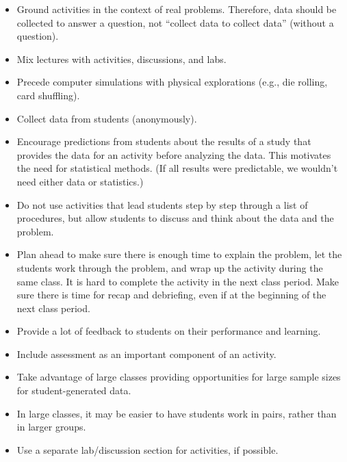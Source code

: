 \documentclass[twoside,openany]{tufte-book}
\begin{document}
\vspace{.2in}
\noindent {}
\begin{itemize}[leftmargin=1cm, itemsep=.2em]
\item Ground activities in the context of real problems. Therefore, data should be collected to answer a question, not ``collect data to collect data'' (without a question).
\item Mix lectures with activities, discussions, and labs.
\item Precede computer simulations with physical explorations (e.g., die rolling, card shuffling).
\item Collect data from students (anonymously).
\item Encourage predictions from students about the results of a study that provides the data for an activity before analyzing the data. This motivates the need for statistical methods. (If all results were predictable, we wouldn't need either data or statistics.)
\item Do not use activities that lead students step by step through a list of procedures, but allow students to discuss and think about the data and the problem.  
\item Plan ahead to make sure there is enough time to explain the problem, let the students work through the problem, and wrap up the activity during the same class. It is hard to complete the activity in the next class period. Make sure there is time for recap and debriefing, even if at the beginning of the next class period.
\item Provide a lot of feedback to students on their performance and learning.
\item Include assessment as an important component of an activity.
\end{itemize}
 
\vspace{.2in}
\noindent {}
\begin{itemize}[leftmargin=1cm, itemsep=.2em]
\item Take advantage of large classes providing opportunities for large sample sizes for student-generated data.
\item In large classes, it may be easier to have students work in pairs, rather than in larger groups.
\item Use a separate lab/discussion section for activities, if possible.
\end{itemize}
\end{document}
